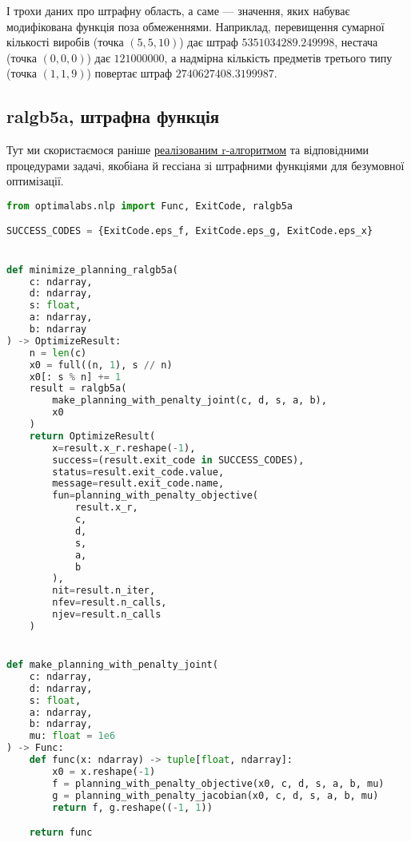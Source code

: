 \documentclass[12pt]{report}
\begin{document}
    І трохи даних про штрафну область, а саме — значення, яких набуває модифікована функція поза обмеженнями.
    Наприклад, перевищення сумарної кількості виробів (точка $(5, 5, 10)$) дає штраф $5351034289.249998$, нестача
    (точка $(0, 0, 0)$) дає $121000000$, а надмірна кількість предметів третього типу (точка $(1, 1, 9)$) повертає
    штраф $2740627408.3199987$.

    \subsection*{ralgb5a, штрафна функція}\label{subsec:ralgb5a-penalty-objective}

    Тут ми скористаємося раніше
    \href{https://github.com/xXxRisingTidexXx/optima-labs/blob/62f605afb3c3caf3be5f4a18b1b14d9a99404bd4/optimalabs/nlp.py}{реалізованим r-алгоритмом}
    та відповідними процедурами задачі, якобіана й гессіана зі штрафними функціями для безумовної оптимізації.

    \begin{lstlisting}[language=Python,label={lst:ralgb5a-penalty-objective}]
from optimalabs.nlp import Func, ExitCode, ralgb5a

SUCCESS_CODES = {ExitCode.eps_f, ExitCode.eps_g, ExitCode.eps_x}


def minimize_planning_ralgb5a(
    c: ndarray,
    d: ndarray,
    s: float,
    a: ndarray,
    b: ndarray
) -> OptimizeResult:
    n = len(c)
    x0 = full((n, 1), s // n)
    x0[: s % n] += 1
    result = ralgb5a(
        make_planning_with_penalty_joint(c, d, s, a, b),
        x0
    )
    return OptimizeResult(
        x=result.x_r.reshape(-1),
        success=(result.exit_code in SUCCESS_CODES),
        status=result.exit_code.value,
        message=result.exit_code.name,
        fun=planning_with_penalty_objective(
            result.x_r,
            c,
            d,
            s,
            a,
            b
        ),
        nit=result.n_iter,
        nfev=result.n_calls,
        njev=result.n_calls
    )


def make_planning_with_penalty_joint(
    c: ndarray,
    d: ndarray,
    s: float,
    a: ndarray,
    b: ndarray,
    mu: float = 1e6
) -> Func:
    def func(x: ndarray) -> tuple[float, ndarray]:
        x0 = x.reshape(-1)
        f = planning_with_penalty_objective(x0, c, d, s, a, b, mu)
        g = planning_with_penalty_jacobian(x0, c, d, s, a, b, mu)
        return f, g.reshape((-1, 1))

    return func
    \end{lstlisting}
\end{document}

